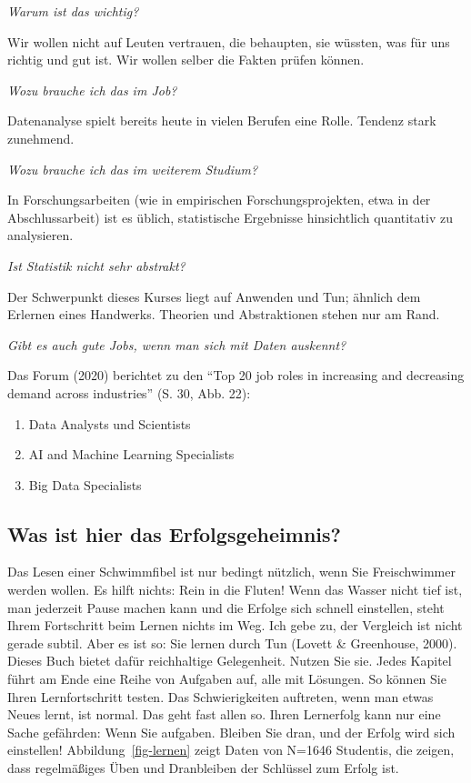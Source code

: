 \documentclass[
  letterpaper,
]{scrbook}
\providecommand{\tightlist}{%
  \setlength{\itemsep}{0pt}\setlength{\parskip}{0pt}}\usepackage{longtable,booktabs,array}
\theoremstyle{definition}
\theoremstyle{definition}
\theoremstyle{definition}
\theoremstyle{remark}
\begin{document}
\emph{Warum ist das wichtig?}

Wir wollen nicht auf Leuten vertrauen, die behaupten, sie wüssten, was
für uns richtig und gut ist. Wir wollen selber die Fakten prüfen können.

\emph{Wozu brauche ich das im Job?}

Datenanalyse spielt bereits heute in vielen Berufen eine Rolle. Tendenz
stark zunehmend.

\emph{Wozu brauche ich das im weiterem Studium?}

In Forschungsarbeiten (wie in empirischen Forschungsprojekten, etwa in
der Abschlussarbeit) ist es üblich, statistische Ergebnisse hinsichtlich
quantitativ zu analysieren.

\emph{Ist Statistik nicht sehr abstrakt?}

Der Schwerpunkt dieses Kurses liegt auf Anwenden und Tun; ähnlich dem
Erlernen eines Handwerks. Theorien und Abstraktionen stehen nur am Rand.

\emph{Gibt es auch gute Jobs, wenn man sich mit Daten auskennt?}

Das Forum (2020) berichtet zu den ``Top 20 job roles in increasing and
decreasing demand across industries'' (S. 30, Abb. 22):

\begin{enumerate}
\def\labelenumi{\arabic{enumi}.}
\tightlist
\item
  Data Analysts und Scientists
\item
  AI and Machine Learning Specialists
\item
  Big Data Specialists
\end{enumerate}

\subsection{Was ist hier das
Erfolgsgeheimnis?}\label{was-ist-hier-das-erfolgsgeheimnis}

Das Lesen einer Schwimmfibel ist nur bedingt nützlich, wenn Sie
Freischwimmer werden wollen. Es hilft nichts: Rein in die Fluten! Wenn
das Wasser nicht tief ist, man jederzeit Pause machen kann und die
Erfolge sich schnell einstellen, steht Ihrem Fortschritt beim Lernen
nichts im Weg. Ich gebe zu, der Vergleich ist nicht gerade subtil. Aber
es ist so: Sie lernen durch Tun (Lovett \& Greenhouse, 2000). Dieses
Buch bietet dafür reichhaltige Gelegenheit. Nutzen Sie sie. Jedes
Kapitel führt am Ende eine Reihe von Aufgaben auf, alle mit Lösungen. So
können Sie Ihren Lernfortschritt testen. Das Schwierigkeiten auftreten,
wenn man etwas Neues lernt, ist normal. Das geht fast allen so. Ihren
Lernerfolg kann nur eine Sache gefährden: Wenn Sie aufgaben. Bleiben Sie
dran, und der Erfolg wird sich einstellen! Abbildung~\ref{fig-lernen}
zeigt Daten von N=1646 Studentis, die zeigen, dass regelmäßiges Üben und
Dranbleiben der Schlüssel zum Erfolg ist.
\end{document}
